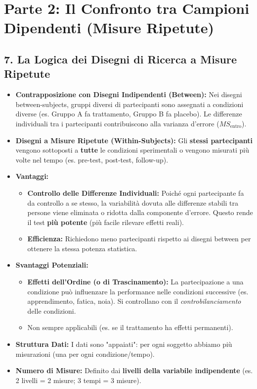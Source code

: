 \documentclass[12pt, a4paper]{article}
\newcommand{\MSw}{MS_{\text{entro}}} %
\begin{document}
\clearpage %

\section*{Parte 2: Il Confronto tra Campioni Dipendenti (Misure Ripetute)}

\subsection*{7. La Logica dei Disegni di Ricerca a Misure Ripetute}
\begin{itemize}
    \item \textbf{Contrapposizione con Disegni Indipendenti (Between):} Nei disegni between-subjects, gruppi diversi di partecipanti sono assegnati a condizioni diverse (es. Gruppo A fa trattamento, Gruppo B fa placebo). Le differenze individuali tra i partecipanti contribuiscono alla varianza d'errore ($\MSw$).
    \item \textbf{Disegni a Misure Ripetute (Within-Subjects):} Gli \textbf{stessi partecipanti} vengono sottoposti a \textbf{tutte} le condizioni sperimentali o vengono misurati più volte nel tempo (es. pre-test, post-test, follow-up).
    \item \textbf{Vantaggi:}
        \begin{itemize}
            \item \textbf{Controllo delle Differenze Individuali:} Poiché ogni partecipante fa da controllo a se stesso, la variabilità dovuta alle differenze stabili tra persone viene eliminata o ridotta dalla componente d'errore. Questo rende il test \textbf{più potente} (più facile rilevare effetti reali).
            \item \textbf{Efficienza:} Richiedono meno partecipanti rispetto ai disegni between per ottenere la stessa potenza statistica.
        \end{itemize}
    \item \textbf{Svantaggi Potenziali:}
        \begin{itemize}
            \item \textbf{Effetti dell'Ordine (o di Trascinamento):} La partecipazione a una condizione può influenzare la performance nelle condizioni successive (es. apprendimento, fatica, noia). Si controllano con il \textit{controbilanciamento} delle condizioni.
            \item Non sempre applicabili (es. se il trattamento ha effetti permanenti).
        \end{itemize}
    \item \textbf{Struttura Dati:} I dati sono "appaiati": per ogni soggetto abbiamo più misurazioni (una per ogni condizione/tempo).
    \item \textbf{Numero di Misure:} Definito dai \textbf{livelli della variabile indipendente} (es. 2 livelli = 2 misure; 3 tempi = 3 misure).
\end{itemize}
\end{document}

